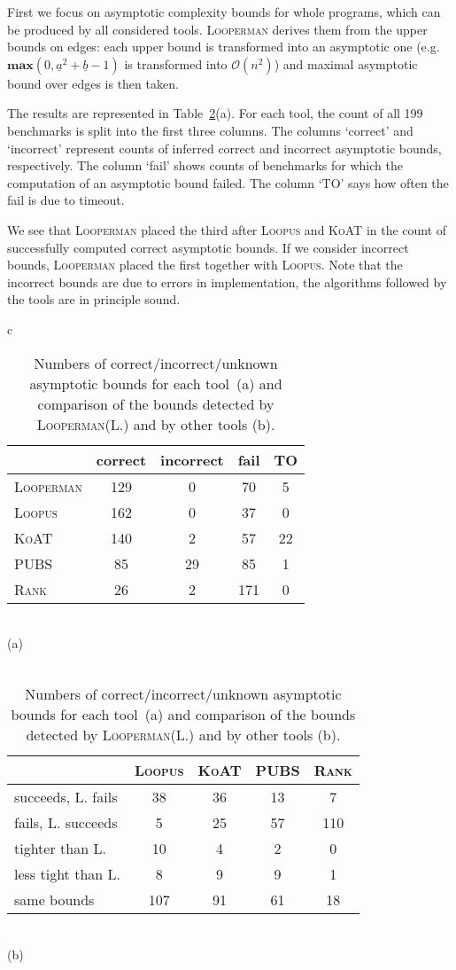 \documentclass[10pt,a4paper]{article}
\newcommand{\Looperman}{\textsc{Looperman}\xspace}
\newcommand{\Loopus}{\textsc{Loopus}\xspace}
\newcommand{\KoAT}{\textsc{KoAT}\xspace}
\newcommand{\PUBS}{\textsc{PUBS}\xspace}
\newcommand{\Rank}{\textsc{Rank}\xspace}
\newcommand{\sym}[1]{\ensuremath{\underline{#1}}}
\newcommand{\maxim}{\ensuremath{\mathbf{max}}}
\begin{document}
First we focus on asymptotic complexity bounds for whole programs,
which can be produced by all considered tools. \Looperman derives them
from the upper bounds on edges: each upper bound is transformed into
an asymptotic one (e.g.~$\maxim(0,\sym{a}^2+\sym{b}-1)$ is transformed
into $\mathcal{O}(n^2)$) and maximal asymptotic bound over edges is
then taken.

The results are represented in Table~\ref{tab:benchAsymp}(a). For each tool,
the count of all 199 benchmarks is split into the first three columns. The
columns `correct' and `incorrect' represent counts of inferred
correct and incorrect asymptotic bounds, respectively. The column
`fail' shows counts of benchmarks for which the computation of an
asymptotic bound failed. The column `TO' says how often the fail is
due to timeout. 

We see that \Looperman placed the third after \Loopus and \KoAT in the count
of successfully computed correct asymptotic bounds.  If we consider
incorrect bounds, \Looperman placed the first together with \Loopus. Note
that the incorrect bounds are due to errors in implementation, the
algorithms followed by the tools are in principle sound.


\begin{table}[t]
\begin{center}
\begin{tabular}{c}
\begin{tabular}{l|cccc}
& correct & incorrect & fail & TO \\
\hline
\Looperman & 129 & 0 & 70 & 5  \\
\Loopus & 162 & 0 & 37 & 0  \\
\KoAT & 140 & 2 & 57&22 \\
\PUBS & 85 & 29 & 85&1 \\
\Rank & 26 & 2 & 171&0 \\[1mm]
\end{tabular}
\\
(a)
\\\\
\setlength{\tabcolsep}{4.5pt}
\begin{tabular}{l|cccc}
& \Loopus & \KoAT & \PUBS & \Rank\\
\hline
succeeds, \textsc{L.} fails & 38 & 36 & 13 & 7 \\
fails, \textsc{L.} succeeds & 5 & 25 & 57 & 110 \\
tighter than \textsc{L.} & 10 & 4 & 2 & 0 \\
less tight than \textsc{L.} & 8 & 9 & 9 & 1 \\
same bounds & 107 & 91 & 61 & 18
\end{tabular}
\\
(b)
\end{tabular}
\end{center}
\caption{Numbers of
  correct/incorrect/unknown asymptotic bounds for each tool~(a) and comparison
  of the bounds detected by \Looperman (\textsc{L.}) and by other tools (b).}
\label{tab:benchAsymp}
\end{table}
\end{document}

